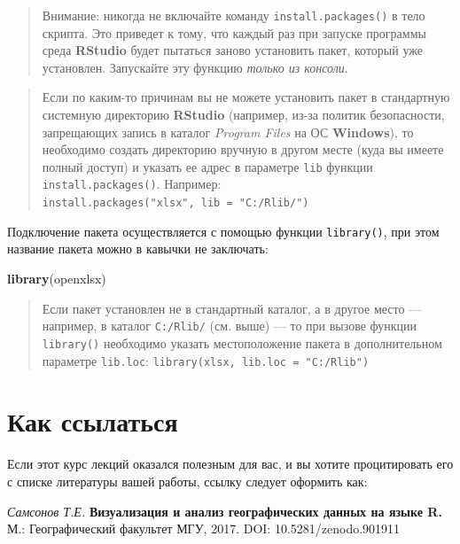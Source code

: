 \documentclass[]{book}
\newenvironment{Shaded}{\begin{snugshade}}{\end{snugshade}}
\newcommand{\KeywordTok}[1]{\textcolor[rgb]{0.13,0.29,0.53}{\textbf{#1}}}
\newcommand{\NormalTok}[1]{#1}
\begin{document}
\begin{quote}
Внимание: никогда не включайте команду \texttt{install.packages()} в
тело скрипта. Это приведет к тому, что каждый раз при запуске программы
среда \textbf{RStudio} будет пытаться заново установить пакет, который
уже установлен. Запускайте эту функцию \emph{только из консоли}.
\end{quote}

\begin{quote}
Если по каким-то причинам вы не можете установить пакет в стандартную
системную директорию \textbf{RStudio} (например, из-за политик
безопасности, запрещающих запись в каталог \emph{Program Files} на ОС
\textbf{Windows}), то необходимо создать директорию вручную в другом
месте (куда вы имеете полный доступ) и указать ее адрес в параметре
\texttt{lib} функции \texttt{install.packages()}. Например:
\texttt{install.packages("xlsx",\ lib\ =\ "C:/Rlib/")}
\end{quote}

Подключение пакета осуществляется с помощью функции \texttt{library()},
при этом название пакета можно в кавычки не заключать:

\begin{Shaded}
\begin{Highlighting}[]
\KeywordTok{library}\NormalTok{(openxlsx)}
\end{Highlighting}
\end{Shaded}

\begin{quote}
Если пакет установлен не в стандартный каталог, а в другое место ---
например, в каталог \texttt{С:/Rlib/} (см. выше) --- то при вызове
функции \texttt{library()} необходимо указать местоположение пакета в
дополнительном параметре \texttt{lib.loc}:
\texttt{library(xlsx,\ lib.loc\ =\ "C:/Rlib")}
\end{quote}

\section*{Как ссылаться}\label{-}

Если этот курс лекций оказался полезным для вас, и вы хотите
процитировать его с списке литературы вашей работы, ссылку следует
оформить как:

\emph{Самсонов Т.Е.} \textbf{Визуализация и анализ географических данных
на языке R.} М.: Географический факультет МГУ, 2017. DOI:
10.5281/zenodo.901911
\end{document}
